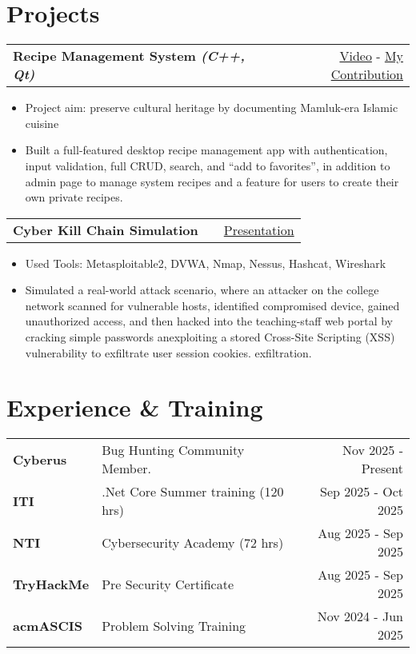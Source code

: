 \documentclass[a4paper,12pt]{article}
\makeatletter
\newenvironment{joblong}[2]
    {
    \begin{tabularx}{\linewidth}{@{}l X r@{}}
    \textbf{#1} & \hfill &  #2 \\[3.75pt]
    \end{tabularx}
    \begin{minipage}[t]{\linewidth}
    \begin{itemize}[nosep,after=\strut, leftmargin=1em, itemsep=3pt,label=--]
    }
    {
    \end{itemize}
    \end{minipage}    
    }
\makeatother
\begin{document}
\section{Projects}
\begin{joblong}{Recipe Management System \textit{(C++, Qt)}}{\href{https://drive.google.com/file/d/1I0ptV7O_kVz5_U3gNDEltskLosu585dp/view}{Video} -  \href{https://github.com/Mohamedeid-11/RMS_Demo}{My Contribution}}
\item Project aim: preserve cultural heritage by documenting Mamluk-era Islamic cuisine
\item Built a full-featured desktop recipe management app with authentication, input validation, full CRUD, search, and “add to favorites”, in addition to admin page to manage system recipes and a feature for users to create their own private recipes.
\end{joblong} 

\begin{joblong}{Cyber Kill Chain Simulation}{\href{https://docs.google.com/presentation/d/1j-j-t3HcRAJUKicOxggxbR5eOk6nW0KD/edit?usp=sharing\&ouid=100071722977707399783\&rtpof=true\&sd=true}{Presentation}}
\item Used Tools: Metasploitable2, DVWA, Nmap, Nessus, Hashcat, Wireshark
\item Simulated a real-world attack scenario, where an attacker on the college network scanned for vulnerable hosts, identified compromised device, gained unauthorized access, and then hacked into the teaching-staff web portal by cracking simple passwords anexploiting a stored Cross-Site Scripting (XSS) vulnerability to exfiltrate user session cookies.
exfiltration.
\end{joblong}

\section{Experience \& Training}

\begin{tabularx}{\linewidth}{@{}lX r@{}}
  \textbf{Cyberus} & Bug Hunting Community Member. & Nov 2025 - Present \\
  
  \textbf{ITI} & .Net Core Summer training (120 hrs) & Sep 2025 - Oct 2025 \\
  
  \textbf{NTI} & Cybersecurity Academy (72 hrs) & Aug 2025 - Sep 2025 \\
  
  \textbf{TryHackMe} & Pre Security Certificate & Aug 2025 - Sep 2025 \\
  
  \textbf{acmASCIS} & Problem Solving Training & Nov 2024 - Jun 2025 \\
\end{tabularx}
\end{document}
